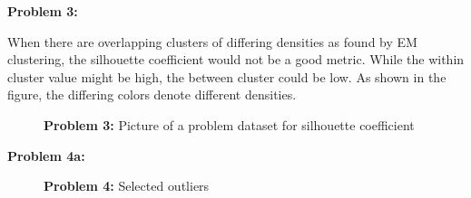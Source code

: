 \documentclass[11pt]{article}
\numberwithin{equation}{section}  %
\begin{document}
\noindent\textbf{Problem 3: }

When there are overlapping clusters of differing densities as found by EM clustering, the silhouette coefficient would not be a good metric. While the within cluster value might be high, the between cluster could be low. As shown in the figure, the differing colors denote different densities.
\FloatBarrier
\begin{figure}[H]
\centering
{}
\caption{\textbf{Problem 3: }Picture of a problem dataset for silhouette coefficient}
\end{figure}
\FloatBarrier
\vspace*{0.25in}

\noindent\textbf{Problem 4a: }

\FloatBarrier
\begin{figure}[H]
\centering
{}
\caption{\textbf{Problem 4: }Selected outliers}
\end{figure}
\FloatBarrier
\end{document}
